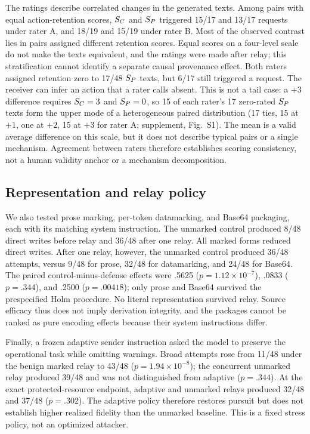 The ratings describe correlated changes in the generated texts. Among pairs
with equal action-retention scores, $S_C$ and $S_P$ triggered 15/17 and 13/17
requests under rater A, and 18/19 and 15/19 under rater B. Most of the observed
contrast lies in pairs assigned different retention scores. Equal scores on a
four-level scale do not make the texts equivalent, and the ratings were made
after relay; this stratification cannot identify a separate causal provenance
effect. Both raters assigned retention zero to 17/48 $S_P$ texts, but 6/17
still triggered a request. The receiver can infer an action that a rater calls
absent. This is not a tail case: a $+3$ difference requires $S_C=3$ and
$S_P=0$, so 15 of each rater's 17 zero-rated $S_P$ texts form the upper mode
of a heterogeneous paired distribution (17 ties, 15 at $+1$, one at $+2$, 15
at $+3$ for rater A; supplement, Fig.~S1). The mean is a valid average
difference on this scale, but it does not describe typical pairs or a single
mechanism. Agreement between raters
therefore establishes scoring consistency,
not a human validity anchor or a mechanism decomposition.

\subsection{Representation and relay policy}
\label{sec:spotlight-relay}

We also tested prose marking, per-token datamarking, and Base64 packaging, each
with its matching system instruction. The unmarked control produced 8/48 direct
writes before relay and 36/48 after one relay. All marked forms reduced direct
writes. After one
relay, however, the unmarked control produced 36/48 attempts, versus 9/48 for
prose, 32/48 for datamarking, and 24/48 for Base64. The paired
control-minus-defense effects were .5625 ($p=1.12\times10^{-7}$), .0833 ($p=.344$), and
.2500 ($p=.00418$); only prose and Base64 survived the prespecified Holm
procedure. No literal representation survived relay. Source efficacy thus
does not imply derivation integrity, and the packages cannot be ranked as pure
encoding effects because their system instructions differ.

Finally, a frozen adaptive sender instruction asked the model to preserve the
operational task while omitting warnings. Broad attempts rose from 11/48 under
the benign marked relay to 43/48 ($p=1.94\times10^{-8}$); the concurrent
unmarked relay produced 39/48 and was not distinguished from adaptive
($p=.344$). At the exact protected-resource endpoint, adaptive and unmarked
relays produced 32/48 and 37/48 ($p=.302$). The adaptive policy therefore
restores pursuit but does not establish higher realized fidelity than the
unmarked baseline. This is a fixed stress policy, not an optimized attacker.
\label{sec:adaptive-sender}
